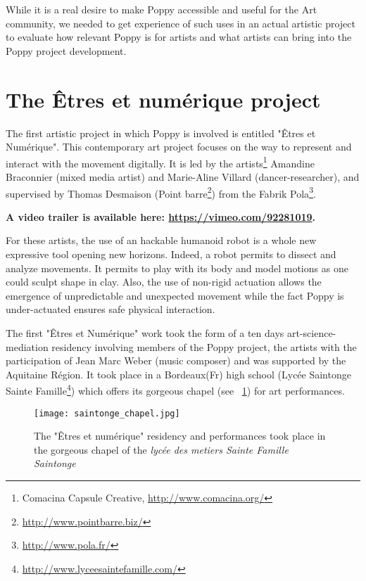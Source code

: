 While it is a real desire to make Poppy accessible and useful for the Art community, we needed to get experience of such uses in an actual artistic project to evaluate how relevant Poppy is for artists and what artists can bring into the Poppy project development.

\section{The Êtres et numérique project} %

The first artistic project in which Poppy is involved is entitled "Êtres et Numérique". This contemporary art project focuses on the way to represent and interact with the movement digitally. It is led by the artists\footnote{Comacina Capsule Creative, \url{http://www.comacina.org/}} Amandine Braconnier (mixed media artist) and Marie-Aline Villard (dancer-researcher), and supervised by Thomas Desmaison (Point barre\footnote{\url{http://www.pointbarre.biz/}}) from the Fabrik Pola\footnote{\url{http://www.pola.fr/}}.

\textbf{A video trailer is available here: \url{https://vimeo.com/92281019}.}

For these artists, the use of an hackable humanoid robot is a whole new expressive tool opening new horizons. Indeed, a robot permits to dissect and analyze movements. It permits to play with its body and model motions as one could sculpt shape in clay. Also, the use of non-rigid actuation allows the emergence of unpredictable and unexpected movement while the fact Poppy is under-actuated ensures safe physical interaction.


The first "Êtres et Numérique" work took the form of a ten days art-science-mediation residency involving members of the Poppy project, the artists with the participation of Jean Marc Weber (music composer) and was supported by the Aquitaine Région. It took place in a Bordeaux(Fr) high school (Lycée Saintonge Sainte Famille\footnote{\url{http://www.lyceesaintefamille.com/}}) which offers its gorgeous chapel (see \figurename~\ref{fig:saintonge_chapel}) for art performances.

\begin{figure}[t]
    \begin{center}
        \texttt{[image: saintonge\_chapel.jpg]}
    \end{center}
    \caption{The "Êtres et numérique" residency and performances took place in the gorgeous chapel of the \emph{lycée des metiers Sainte Famille Saintonge}}
    \label{fig:saintonge_chapel}
\end{figure}


